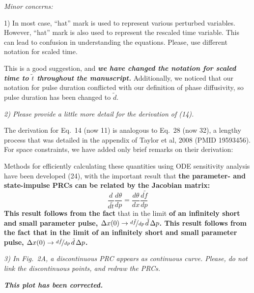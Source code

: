 \documentclass[11pt, letterpaper]{article}
\newenvironment{reviewer}{\itshape\color{gray}}{}
\newenvironment{manuscript}[1]{\begin{center}\begin{tcolorbox}[colback=green!5!white,colframe=green!75!black,width=0.8\textwidth,title={#1},breakable,fonttitle=\bfseries]}{\end{tcolorbox}\end{center}}
\begin{document}
\begin{reviewer}
Minor concerns: 

1) In most case, ``hat'' mark is used to represent various perturbed variables.
However, ``hat'' mark is also used to represent the rescaled time variable.
This can lead to confusion in understanding the equations.
Please, use different notation for scaled time.
\end{reviewer}

This is a good suggestion, and {\itshape\bfseries we have changed the notation for scaled time to $\tilde{t}$ throughout the manuscript.}
Additionally, we noticed that our notation for pulse duration conflicted with our definition of phase diffusivity, so pulse duration has been changed to $\tilde{d}$.

\begin{reviewer}
2) Please provide a little more detail for the derivation of (14).
\end{reviewer}

The derivation for Eq.~14 (now 11) is analogous to Eq.~28 (now 32), a lengthy process that was detailed in the appendix of Taylor et al, 2008 (PMID 19593456).
For space constraints, we have added only brief remarks on their derivation:

\begin{manuscript}{Page 5}
  Methods for efficiently calculating these quantities using ODE sensitivity analysis have been developed (24), with the important result that {\bfseries the parameter- and state-impulse PRCs can be related by the Jacobian matrix:}
\begin{equation}
  \frac{d}{d\tilde{t}}\frac{d\theta}{dp} = \frac{d\theta}{dx}\frac{d\tilde{f}}{dp} 
  \tag{11}
\end{equation}
{\bfseries This result follows from the fact} that in the limit {\bfseries of an infinitely short and small parameter pulse, $\Delta x(0) \to \nicefrac{d\tilde{f}}{dp}\,\tilde{d}\, \Delta p$.
This result follows from the fact that in the limit of an infinitely short and small parameter pulse, $\Delta x(0) \to \nicefrac{d\tilde{f}}{dp}\,\tilde{d}\, \Delta p$.}
\end{manuscript}

\begin{reviewer}
3) In Fig.~2A, a discontinuous PRC appears as continuous curve.
Please, do not link the discontinuous points, and redraw the PRCs.
\end{reviewer}

{\bfseries\itshape This plot has been corrected.}
\end{document}
